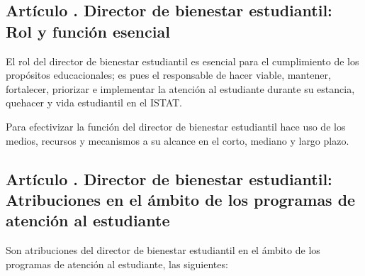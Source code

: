 \subsection{Artículo . Director de bienestar estudiantil: Rol y función esencial}
\addtocounter{ns}{1}
El rol del director de bienestar estudiantil es esencial para el cumplimiento de los propósitos educacionales; es pues el responsable de hacer viable, mantener, fortalecer, priorizar e implementar la atención al estudiante durante su estancia, quehacer y vida estudiantil en el ISTAT.  

Para efectivizar la función del director de bienestar estudiantil hace uso de los medios, recursos y mecanismos a su alcance en el corto, mediano y largo plazo. 
\subsection{Artículo . Director de bienestar estudiantil: Atribuciones en el ámbito de los programas de atención al estudiante}
\addtocounter{ns}{1}
Son atribuciones del director de bienestar estudiantil en el ámbito de los programas de atención al estudiante, las siguientes: 
